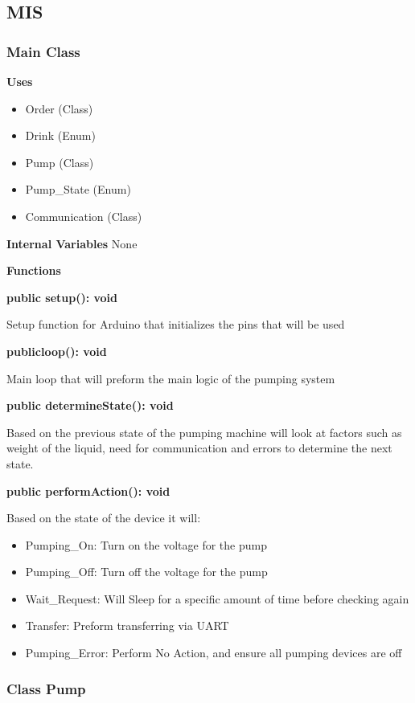 \documentclass [10pt]{article}
\begin{document}
\subsection{MIS}

\subsubsection{Main Class}

\textbf{Uses}
\begin{itemize}
	\item Order (Class)
	\item Drink (Enum)
	\item Pump (Class)
	\item Pump\_State (Enum)
	\item Communication (Class)
\end{itemize}

\textbf{Internal Variables}
None

\textbf{Functions}

\textbf{public setup(): void}

Setup function for Arduino that initializes the pins that will be used 

\textbf{publicloop(): void}

Main loop that will preform the main logic of the pumping system

\textbf{public determineState(): void}

Based on the previous state of the pumping machine will look at factors such as weight of the liquid, need for communication and errors to determine the next state.

\textbf{public performAction(): void}

Based on the state of the device it will:
\begin{itemize}
	
	\item Pumping\_On: Turn on the voltage for the pump
	\item Pumping\_Off: Turn off the voltage for the pump
	
	\item Wait\_Request: Will Sleep for a specific amount of time before checking again
	\item Transfer: Preform transferring via UART
	\item Pumping\_Error: Perform No Action, and ensure all pumping devices are off
\end{itemize}

\subsubsection{Class Pump}
\end{document}
